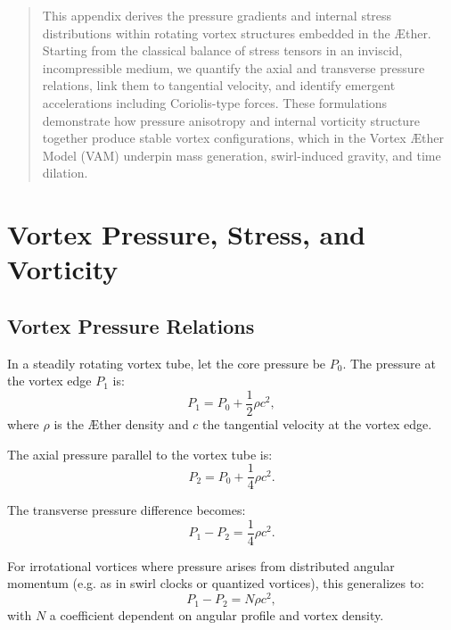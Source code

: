 \documentclass[12pt]{article}
\begin{document}
    \titlepageOpen

    \begin{abstract}
        This appendix derives the pressure gradients and internal stress distributions within rotating vortex structures embedded in the Æther. Starting from the classical balance of stress tensors in an inviscid, incompressible medium, we quantify the axial and transverse pressure relations, link them to tangential velocity, and identify emergent accelerations including Coriolis-type forces. These formulations demonstrate how pressure anisotropy and internal vorticity structure together produce stable vortex configurations, which in the Vortex Æther Model (VAM) underpin mass generation, swirl-induced gravity, and time dilation.
    \end{abstract}


    \titlepageClose
    \fi

    \section{Vortex Pressure, Stress, and Vorticity}


    \subsection{Vortex Pressure Relations}
    In a steadily rotating vortex tube, let the core pressure be \(P_0\). The pressure at the vortex edge \(P_1\) is:
    \begin{equation}
        P_1 = P_0 + \frac{1}{2} \rho c^2,
    \end{equation}
    where \(\rho\) is the Æther density and \(c\) the tangential velocity at the vortex edge.

    The axial pressure parallel to the vortex tube is:
    \begin{equation}
        P_2 = P_0 + \frac{1}{4} \rho c^2.
    \end{equation}

    The transverse pressure difference becomes:
    \begin{equation}
        P_1 - P_2 = \frac{1}{4} \rho c^2.
    \end{equation}

    For irrotational vortices where pressure arises from distributed angular momentum (e.g. as in swirl clocks or quantized vortices), this generalizes to:
    \begin{equation}
        P_1 - P_2 = N \rho c^2,
    \end{equation}
    with \(N\) a coefficient dependent on angular profile and vortex density.
\end{document}
